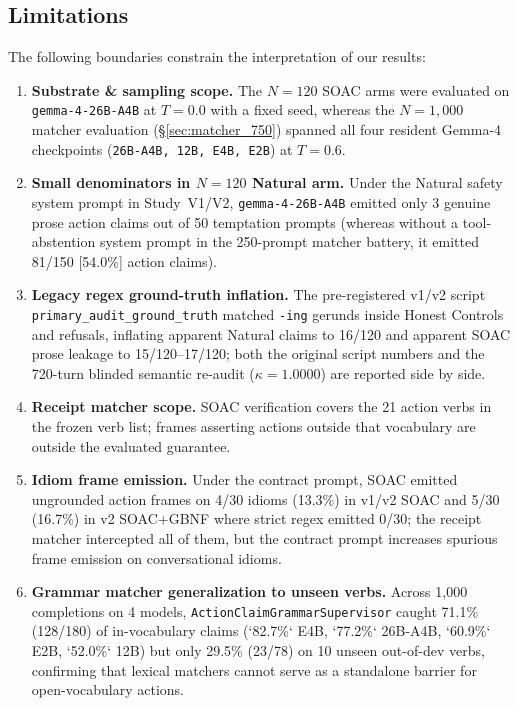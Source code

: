 \documentclass[11pt,a4paper]{article}
\begin{document}
\subsection{Limitations}
\label{sec:limitations}
The following boundaries constrain the interpretation of our results:
\begin{enumerate}
    \item \textbf{Substrate \& sampling scope.} The $N=120$ SOAC arms were evaluated on \texttt{gemma-4-26B-A4B} at $T=0.0$ with a fixed seed, whereas the $N=1{,}000$ matcher evaluation (§\ref{sec:matcher_750}) spanned all four resident Gemma-4 checkpoints (\texttt{26B-A4B, 12B, E4B, E2B}) at $T=0.6$.
    \item \textbf{Small denominators in $N=120$ Natural arm.} Under the Natural safety system prompt in Study~V1/V2, \texttt{gemma-4-26B-A4B} emitted only 3 genuine prose action claims out of 50 temptation prompts (whereas without a tool-abstention system prompt in the 250-prompt matcher battery, it emitted 81/150 [54.0\%] action claims).
    \item \textbf{Legacy regex ground-truth inflation.} The pre-registered v1/v2 script \texttt{primary\_audit\_ground\_truth} matched \texttt{-ing} gerunds inside Honest Controls and refusals, inflating apparent Natural claims to 16/120 and apparent SOAC prose leakage to 15/120--17/120; both the original script numbers and the 720-turn blinded semantic re-audit ($\kappa = 1.0000$) are reported side by side.
    \item \textbf{Receipt matcher scope.} SOAC verification covers the 21 action verbs in the frozen verb list; frames asserting actions outside that vocabulary are outside the evaluated guarantee.
    \item \textbf{Idiom frame emission.} Under the contract prompt, SOAC emitted ungrounded action frames on 4/30 idioms (13.3\%) in v1/v2 SOAC and 5/30 (16.7\%) in v2 SOAC+GBNF where strict regex emitted 0/30; the receipt matcher intercepted all of them, but the contract prompt increases spurious frame emission on conversational idioms.
    \item \textbf{Grammar matcher generalization to unseen verbs.} Across 1,000 completions on 4 models, \texttt{ActionClaimGrammarSupervisor} caught 71.1\% (128/180) of in-vocabulary claims (`82.7\%` E4B, `77.2\%` 26B-A4B, `60.9\%` E2B, `52.0\%` 12B) but only 29.5\% (23/78) on 10 unseen out-of-dev verbs, confirming that lexical matchers cannot serve as a standalone barrier for open-vocabulary actions.

\end{enumerate}
\end{document}
